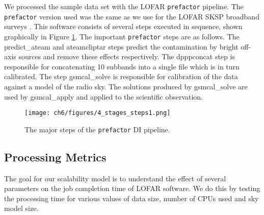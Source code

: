 We processed the sample data set with the LOFAR \texttt{prefactor} pipeline. The \texttt{prefactor} version used was the same as we use for the LOFAR SKSP broadband surveys \citep{prefactor_zenodo}. This software consists of several steps executed in sequence, shown graphically in Figure \ref{fig:ch6_prefactor_steps}. The important \texttt{prefactor} steps are as follows. The {\selectfont predict\_ateam} and {\selectfont ateamcliptar} steps predict the contamination by bright off-axis sources and remove these effects respectively. The {\selectfont dpppconcat} step is responsible for concatenating 10 subbands into a single file which is in turn calibrated. The step {\selectfont gsmcal\_solve} is responsible for calibration of the data against a model of the radio sky. The solutions produced by {\selectfont gsmcal\_solve} are used by {\selectfont gsmcal\_apply} and applied to the scientific observation.

\begin{figure}
    \texttt{[image: ch6/figures/4\_stages\_steps1.png]}
      \caption{The major steps of the \texttt{prefactor} DI pipeline. }
	\label{fig:ch6_prefactor_steps}
\end{figure}

\subsection{Processing Metrics}
The goal for our scalability model is to understand the effect of several parameters on the job completion time of LOFAR software. We do this by testing the processing time for various values of data size, number of CPUs used and sky model size. 
 

